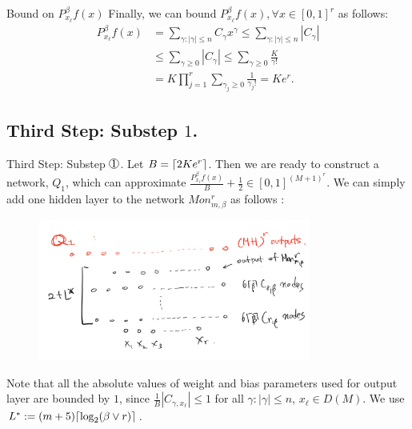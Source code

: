 \documentclass{if-beamer}
\DeclarePairedDelimiter{\ceil}{\lceil}{\rceil}
\newcommand*\circled[1]{\tikz[baseline=(char.base)]{
            \node[shape=circle,draw,inner sep=0.2pt] (char) {#1};}}
\begin{document}
\begin{frame}{Bound on $P^{\beta}_{x_{\ell}}f(x)$}
    Finally, we can bound $P^{\beta}_{x_{\ell}}f(x),\forall x\in[0,1]^{r}$ as follows:
    \begin{align*}
        P_{x_{\ell}}^{\beta}f(x)&=\sum_{\gamma:|\gamma|\leq n} C_{\gamma}x^{\gamma}
        \leq \sum_{\gamma:|\gamma|\leq n} |C_{\gamma}| \\
        &\leq \sum_{\gamma \geq 0} |C_{\gamma}| \leq \sum_{\gamma \geq 0} \frac{K}{\gamma!} \\
        &= K \prod_{j=1}^{r} \sum_{\gamma_{j} \geq 0} \frac{1}{\gamma_{j}!}=Ke^{r}.
    \end{align*}
\end{frame}


\subsection{Third Step: Substep $1$.}
\begin{frame}{Third Step: Substep $\circled{1}$.}
Let $B=\ceil{2Ke^{r}}$. Then we are ready to construct a network, $Q_{1}$, which can approximate $\frac{P^{\beta}_{x_{\ell}}f(x)}{B}+\frac{1}{2}\in[0,1]^{(M+1)^{r}}$.
We can simply add one hidden layer to the network $Mon_{m,\beta}^{r}$ as follows : 

\begin{figure}[htbp]
    \includegraphics[width=0.8\textwidth]{Substep1.png}
    \label{fig:figure8}
\end{figure}
    
Note that all the absolute values of weight and bias parameters used for output layer are bounded by $1$, since $\frac{1}{B}|C_{\gamma,x_{\ell}}|\leq 1$ for all $\gamma:|\gamma|\leq n$, $x_{\ell}\in D(M)$.
We use $L^*:=(m+5)\ceil{\log_{2}(\beta\vee r)}$.
\end{frame}
\end{document}
